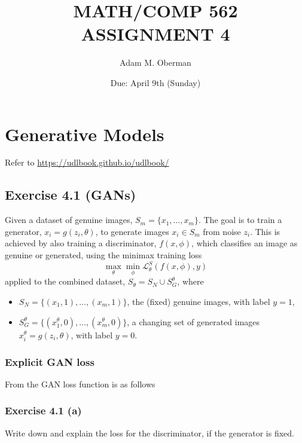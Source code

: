 \documentclass[
10pt, %
a4paper, %
oneside, %
headinclude,footinclude, %
BCOR5mm, %
]{scrartcl}
\title{\normalfont\spacedallcaps{Language reclamation: Literature review}} %
\author{\spacedlowsmallcaps{Caleb Moses*}} %
\date{} %
\begin{document}
\title{MATH/COMP 562 ASSIGNMENT 4}
\date{Due: April 9th (Sunday)}
\author{Adam M. Oberman}
\maketitle

\section*{Generative Models}
Refer to \url{https://udlbook.github.io/udlbook/}

\subsection*{Exercise 4.1 (GANs)}

Given a dataset of genuine images, $S_m = \{x_1, \ldots, x_m\}$. The goal is to train a generator, $x_i = g(z_i, \theta)$, to generate images $x_i \in S_m$ from noise $z_i$. This is achieved by also training a discriminator, $f(x, \phi)$, which classifies an image as genuine or generated, using the minimax training loss
\begin{equation*}
\max_\theta \min_\phi \mathcal{L}^S_\theta(f(x, \phi), y)
\end{equation*}
applied to the combined dataset, $S_\theta = S_N \cup S_G^\theta$,
where
\begin{itemize}
    \item $S_N = \{(x_1, 1), \ldots, (x_m, 1)\}$, the (fixed) genuine images, with label $y = 1$,
    \item $S_G^\theta = \{(x^\theta_1, 0), \ldots, (x^\theta_m, 0)\}$, a changing set of generated images $x^\theta_i = g(z_i, \theta)$, with label $y = 0$.
\end{itemize}

\subsubsection*{Explicit GAN loss}

From \citet{prince2023understanding} the GAN loss function is as follows


\subsubsection*{Exercise 4.1 (a)}
Write down and explain the loss for the discriminator, if the generator is fixed.
\end{document}
